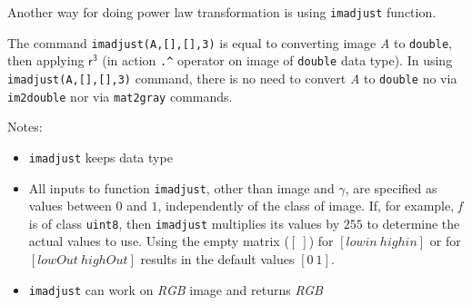 Another way for doing power law transformation is using \texttt{imadjust} 
function.

The command \texttt{imadjust(A,[],[],3)} is equal to converting image 
\emph{A} to \texttt{double}, then applying \texttt{$\mathsf{r^3}$} (in action 
\texttt{.\string^} operator on image of \texttt{double} data type). In using 
\texttt{imadjust(A,[],[],3)} command, there is no need to convert \emph{A} to 
\texttt{double} no via \texttt{im2double} nor via \texttt{mat2gray} commands.

Notes: 
\begin{itemize}
    \item \texttt{imadjust} keeps data type
    \item All inputs to function \texttt{imadjust}, other than image and 
        $\gamma$, are specified as values between $0$ and $1$, 
        independently of the class of image. If, for example, 
        \emph{f} is of class \texttt{uint8}, then \texttt{imadjust} multiplies 
        its values by $255$ to determine the actual values to use. Using the 
        empty matrix ($[ \ ]$) for $[lowin\ highin]$ or for $[lowOut\ highOut]$ 
        results in the default values $[0 \ 1]$.
    \item \texttt{imadjust} can work on \emph{RGB} image and returns \emph{RGB}

\end{itemize}


